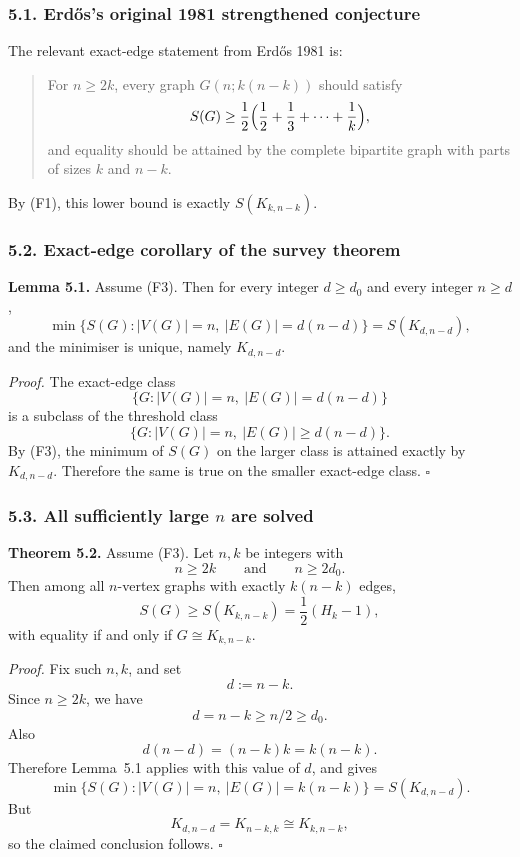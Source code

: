 \subsubsection*{5.1. Erd\H{o}s's original 1981 strengthened conjecture}

The relevant exact-edge statement from Erd\H{o}s 1981 is:
\begin{quote}
For $n\ge 2k$, every graph $G(n; k(n-k))$ should satisfy
\[
S(G)\ge \frac12\Bigl(\frac12+\frac13+\cdots+\frac1k\Bigr),
\]
and equality should be attained by the complete bipartite graph with parts of sizes $k$ and $n-k$.
\end{quote}
By (F1), this lower bound is exactly $S(K_{k,n-k})$.

\subsubsection*{5.2. Exact-edge corollary of the survey theorem}

\textbf{Lemma 5.1.}
Assume (F3). Then for every integer $d\ge d_0$ and every integer $n\ge d$,
\[
\min\{S(G): |V(G)|=n,\ |E(G)|=d(n-d)\}=S(K_{d,n-d}),
\]
and the minimiser is unique, namely $K_{d,n-d}$.

\medskip
\textit{Proof.}
The exact-edge class
\[
\{G: |V(G)|=n,\ |E(G)|=d(n-d)\}
\]
is a subclass of the threshold class
\[
\{G: |V(G)|=n,\ |E(G)|\ge d(n-d)\}.
\]
By (F3), the minimum of $S(G)$ on the larger class is attained exactly by $K_{d,n-d}$. Therefore the same is true on the smaller exact-edge class.
\hfill$\square$

\subsubsection*{5.3. All sufficiently large $n$ are solved}

\textbf{Theorem 5.2.}
Assume (F3). Let $n,k$ be integers with
\[
n\ge 2k
\qquad\text{and}\qquad
n\ge 2d_0.
\]
Then among all $n$-vertex graphs with exactly $k(n-k)$ edges,
\[
S(G)\ge S(K_{k,n-k})=\frac12(H_k-1),
\]
with equality if and only if $G\cong K_{k,n-k}$.

\medskip
\textit{Proof.}
Fix such $n,k$, and set
\[
d:=n-k.
\]
Since $n\ge 2k$, we have
\[
d=n-k\ge n/2\ge d_0.
\]
Also
\[
d(n-d)=(n-k)k=k(n-k).
\]
Therefore Lemma~5.1 applies with this value of $d$, and gives
\[
\min\{S(G): |V(G)|=n,\ |E(G)|=k(n-k)\}=S(K_{d,n-d}).
\]
But
\[
K_{d,n-d}=K_{n-k,k}\cong K_{k,n-k},
\]
so the claimed conclusion follows.
\hfill$\square$

